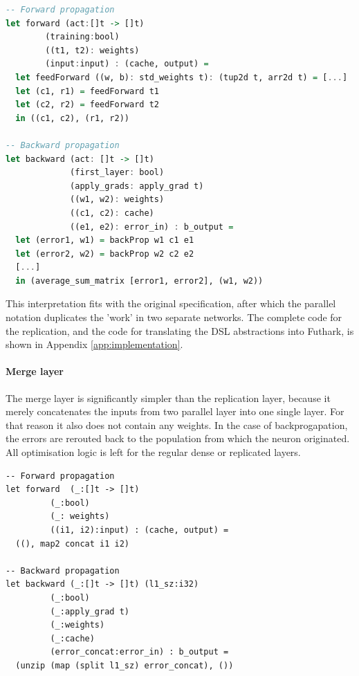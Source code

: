 \begin{lstlisting}[language=Haskell,label={code:bp-replicate},caption={Part
    of the forward and backward propagation algorithms for the replicate layer.
Abbreviated for clarity.}]
-- Forward propagation
let forward (act:[]t -> []t)
	    (training:bool)
	    ((t1, t2): weights)
	    (input:input) : (cache, output) =
  let feedForward ((w, b): std_weights t): (tup2d t, arr2d t) = [...]
  let (c1, r1) = feedForward t1
  let (c2, r2) = feedForward t2
  in ((c1, c2), (r1, r2))

-- Backward propagation
let backward (act: []t -> []t)
             (first_layer: bool)
             (apply_grads: apply_grad t)
             ((w1, w2): weights)
             ((c1, c2): cache)
             ((e1, e2): error_in) : b_output =
  let (error1, w1) = backProp w1 c1 e1
  let (error2, w2) = backProp w2 c2 e2
  [...]
  in (average_sum_matrix [error1, error2], (w1, w2))
\end{lstlisting}

This interpretation fits with the original specification, after which
the parallel notation duplicates the 'work' in two separate networks.
The complete code for the replication, and the code for translating the \gls{DSL}
abstractions into Futhark, is shown in Appendix 
\ref{app:implementation}.

\paragraph{Merge layer}
The merge layer is significantly simpler than the replication layer,
because it merely concatenates the inputs from two parallel layer into one single
layer. 
For that reason it also does not contain any weights.
In the case of backprogapation, the errors are rerouted back to
the population from which the neuron originated.
All optimisation logic is left for the regular dense or replicated
layers.

\begin{lstlisting}[caption={Functions for forward and backward propagation in
the merge layer.}]
-- Forward propagation
let forward  (_:[]t -> []t)
	     (_:bool)
	     (_: weights)
	     ((i1, i2):input) : (cache, output) =
  ((), map2 concat i1 i2)

-- Backward propagation
let backward (_:[]t -> []t) (l1_sz:i32)
	     (_:bool)
	     (_:apply_grad t)
	     (_:weights)
	     (_:cache)
	     (error_concat:error_in) : b_output =
  (unzip (map (split l1_sz) error_concat), ())
\end{lstlisting}

